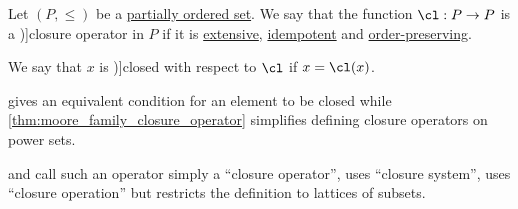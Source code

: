 \begin{definition}\label{def:abstract_closure_operator}
  Let \( (P, \leq) \) be a \hyperref[def:partially_ordered_set]{partially ordered set}. We say that the function \( \cl: P \to P \) is a \term[ru=оператор замыкания (\cite[def. 4.12]{Гуров2013ТеорияРешёток})]{closure operator} in \( P \) if it is \hyperref[def:extensive_function]{extensive}, \hyperref[def:idempotent_function]{idempotent} and \hyperref[def:order_function/preserving]{order-preserving}.

  We say that \( x \) is \term[ru=замкнутый (\cite[def. 4.12]{Гуров2013ТеорияРешёток})]{closed} with respect to \( \cl \) if \( x = \cl(x) \).
\end{definition}
\begin{comments}
  \item {} gives an equivalent condition for an element to be closed while \cref{thm:moore_family_closure_operator} simplifies defining closure operators on power sets.

  \item \Textcite[40]{Harzheim2005OrderedSets} and \textcite[146]{DaveyPriestley2002LatticeTheory} call such an operator simply a \enquote{closure operator}, \textcite[def. 26]{Grätzer2011LatticeTheory} uses \enquote{closure system}, \textcite[111]{Birkhoff1967LatticeTheory} uses \enquote{closure operation} but restricts the definition to lattices of subsets.
\end{comments}

